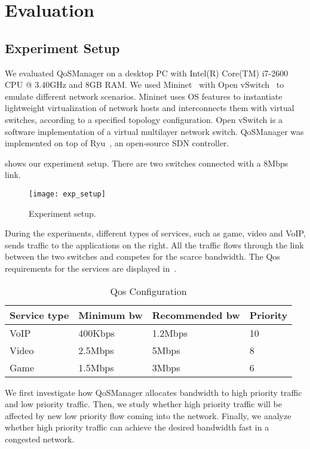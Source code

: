 \section{Evaluation}
\label{sect:experiment} 

\subsection{Experiment Setup}
We evaluated QoSManager on a desktop PC with Intel(R) Core(TM) i7-2600 CPU @ 3.40GHz and 8GB RAM. We used Mininet~\cite{mininet} with Open vSwitch~\cite{openvswitch} to emulate
different network scenarios. Mininet uses OS features to instantiate lightweight virtualization of network hosts and interconnects them with virtual switches, according to a
specified topology configuration. Open vSwitch is a software implementation of a virtual multilayer network switch. QoSManager was implemented on top of Ryu~\cite{ryu}, an
open-source SDN controller.

 shows our experiment setup. There are two switches connected with a 8Mbps link.

\begin{figure}[htb]
\centering
\texttt{[image: exp\_setup]}
\caption{Experiment setup.}
\label{fig:setup}
\end{figure}

During the experiments, different types of services, such as game, video and VoIP, sends traffic to the applications on the right. All the traffic flows through the link between
the two switches and competes for the scarce bandwidth. The Qos requirements for the services are displayed in~.

\begin{table}[htb]
\scriptsize
\caption{Qos Configuration}
\begin{tabular}{|l|l|l|l|}
\hline Service type & Minimum bw & Recommended bw & Priority \\
\hline
\hline VoIP & 400Kbps & 1.2Mbps & 10 \\
\hline Video & 2.5Mbps & 5Mbps & 8  \\
\hline Game & 1.5Mbps & 3Mbps & 6  \\
\hline
\end{tabular}
\label{table:qos_config}
\end{table}

We first investigate how QoSManager allocates bandwidth to high priority traffic and low priority traffic. Then, we study whether high priority traffic will be affected by
new low priority flow coming into the network. Finally, we analyze whether high priority traffic can achieve the desired bandwidth fast in a congested network.

